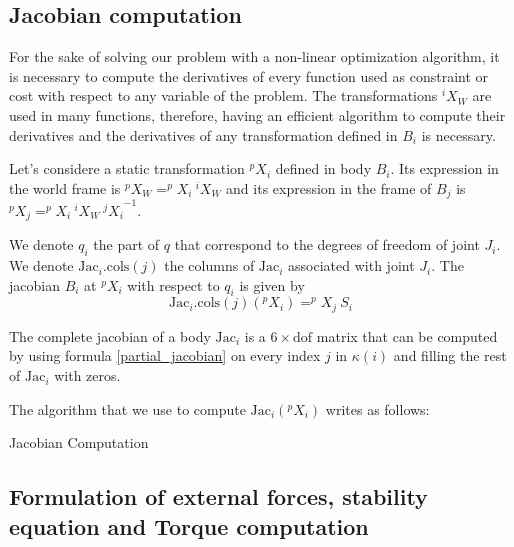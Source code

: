 \subsection{Jacobian computation}
\label{sub:jacobian_computation}

For the sake of solving our problem with a non-linear optimization algorithm, it is necessary to compute the derivatives of every function used as constraint or cost with respect to any variable of the problem.
The transformations $^iX_W$ are used in many functions, therefore, having an efficient algorithm to compute their derivatives and the derivatives of any transformation defined in $B_i$ is necessary.

Let's considere a static transformation $^pX_i$ defined in body $B_i$.
Its expression in the world frame is $^pX_W = ^pX_i\ ^iX_W$ and its expression in the frame of $B_j$ is $^pX_j = ^pX_i\ ^iX_W\ {^jX_i}^{-1}$.

We denote $q_i$ the part of $q$ that correspond to the degrees of freedom of joint $J_i$.
We denote $\text{Jac}_i.\text{cols}(j)$ the columns of $\text{Jac}_i$ associated with joint $J_i$.
The jacobian $B_i$ at $^pX_i$ with respect to $q_i$ is given by
\begin{equation}
  \label{partial_jacobian}
  \text{Jac}_i.\text{cols}(j)(^pX_i) = ^pX_j\ S_i
\end{equation}

The complete jacobian of a body $\text{Jac}_i$ is a $6\times \text{dof}$ matrix that can be computed by using formula \ref{partial_jacobian} on every index $j$ in $\kappa(i)$ and filling the rest of $\text{Jac}_i$ with zeros.

The algorithm that we use to compute $\text{Jac}_i({}^pX_i)$ writes as follows:

\begin{algorithm}
  \caption{Jacobian Computation}
  \label{Jacobian}
\begin{algorithmic}
  \EndFor
\end{algorithmic}
\end{algorithm}

\subsection{Formulation of external forces, stability equation and Torque computation}
\label{sub:formulation_of_external_forces_stability_equation_and_torque_computation}

